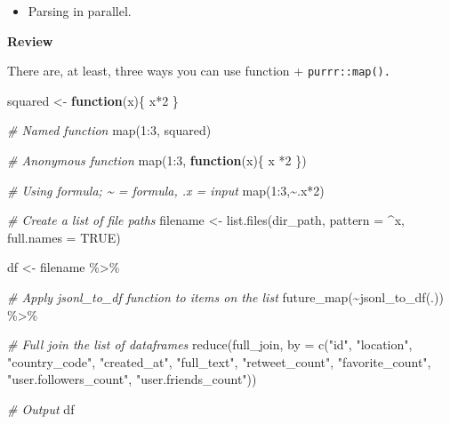 \documentclass[
]{book}
\newenvironment{Shaded}{\begin{snugshade}}{\end{snugshade}}
\newcommand{\AttributeTok}[1]{\textcolor[rgb]{0.77,0.63,0.00}{#1}}
\newcommand{\CommentTok}[1]{\textcolor[rgb]{0.56,0.35,0.01}{\textit{#1}}}
\newcommand{\ConstantTok}[1]{\textcolor[rgb]{0.00,0.00,0.00}{#1}}
\newcommand{\ControlFlowTok}[1]{\textcolor[rgb]{0.13,0.29,0.53}{\textbf{#1}}}
\newcommand{\DecValTok}[1]{\textcolor[rgb]{0.00,0.00,0.81}{#1}}
\newcommand{\FunctionTok}[1]{\textcolor[rgb]{0.00,0.00,0.00}{#1}}
\newcommand{\NormalTok}[1]{#1}
\newcommand{\OtherTok}[1]{\textcolor[rgb]{0.56,0.35,0.01}{#1}}
\newcommand{\SpecialCharTok}[1]{\textcolor[rgb]{0.00,0.00,0.00}{#1}}
\newcommand{\StringTok}[1]{\textcolor[rgb]{0.31,0.60,0.02}{#1}}
\providecommand{\tightlist}{%
  \setlength{\itemsep}{0pt}\setlength{\parskip}{0pt}}
\begin{document}
\begin{itemize}
\tightlist
\item
  Parsing in parallel.
\end{itemize}

\textbf{Review}

There are, at least, three ways you can use function + \texttt{purrr::map().}

\begin{Shaded}
\begin{Highlighting}[]
\NormalTok{squared }\OtherTok{\textless{}{-}} \ControlFlowTok{function}\NormalTok{(x)\{}
\NormalTok{  x}\SpecialCharTok{*}\DecValTok{2} 
\NormalTok{\}}

\CommentTok{\# Named function }
\FunctionTok{map}\NormalTok{(}\DecValTok{1}\SpecialCharTok{:}\DecValTok{3}\NormalTok{, squared)}

\CommentTok{\# Anonymous function }
\FunctionTok{map}\NormalTok{(}\DecValTok{1}\SpecialCharTok{:}\DecValTok{3}\NormalTok{, }\ControlFlowTok{function}\NormalTok{(x)\{ x }\SpecialCharTok{*}\DecValTok{2}\NormalTok{ \})}

\CommentTok{\# Using formula; \textasciitilde{} = formula, .x = input }
\FunctionTok{map}\NormalTok{(}\DecValTok{1}\SpecialCharTok{:}\DecValTok{3}\NormalTok{,}\SpecialCharTok{\textasciitilde{}}\NormalTok{.x}\SpecialCharTok{*}\DecValTok{2}\NormalTok{)}
\end{Highlighting}
\end{Shaded}

\begin{Shaded}
\begin{Highlighting}[]
\CommentTok{\# Create a list of file paths }
\NormalTok{filename }\OtherTok{\textless{}{-}} \FunctionTok{list.files}\NormalTok{(dir\_path,}
          \AttributeTok{pattern =} \StringTok{\textquotesingle{}\^{}x\textquotesingle{}}\NormalTok{,}
          \AttributeTok{full.names =} \ConstantTok{TRUE}\NormalTok{)}

\NormalTok{df }\OtherTok{\textless{}{-}}\NormalTok{ filename }\SpecialCharTok{\%\textgreater{}\%}

\CommentTok{\# Apply jsonl\_to\_df function to items on the list}
\FunctionTok{future\_map}\NormalTok{(}\SpecialCharTok{\textasciitilde{}}\FunctionTok{jsonl\_to\_df}\NormalTok{(.)) }\SpecialCharTok{\%\textgreater{}\%}

\CommentTok{\# Full join the list of dataframes}
\FunctionTok{reduce}\NormalTok{(full\_join,}
       \AttributeTok{by =} \FunctionTok{c}\NormalTok{(}\StringTok{"id"}\NormalTok{,}
              \StringTok{"location"}\NormalTok{,}
              \StringTok{"country\_code"}\NormalTok{,}
              \StringTok{"created\_at"}\NormalTok{,}
              \StringTok{"full\_text"}\NormalTok{,}
              \StringTok{"retweet\_count"}\NormalTok{,}
              \StringTok{"favorite\_count"}\NormalTok{,}
              \StringTok{"user.followers\_count"}\NormalTok{,}
              \StringTok{"user.friends\_count"}\NormalTok{))}

\CommentTok{\# Output}
\NormalTok{df}
\end{Highlighting}
\end{Shaded}
\end{document}

